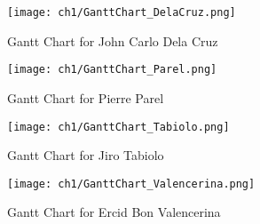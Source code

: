 \begin{figure}[H]
    \centering
    \texttt{[image: ch1/GanttChart\_DelaCruz.png]}
    \caption{Gantt Chart for John Carlo Dela Cruz}
    \label{fig:gantt_jc}
\end{figure}
\begin{figure}[H]
    \centering
    \texttt{[image: ch1/GanttChart\_Parel.png]}
    \caption{Gantt Chart for Pierre Parel}
    \label{fig:gantt_pierre}
\end{figure}
\begin{figure}[H]
    \centering
    \texttt{[image: ch1/GanttChart\_Tabiolo.png]}
    \caption{Gantt Chart for Jiro Tabiolo}
    \label{fig:gantt_jiro}
\end{figure}
\begin{figure}[H]
    \centering
    \texttt{[image: ch1/GanttChart\_Valencerina.png]}
    \caption{Gantt Chart for Ercid Bon Valencerina}
    \label{fig:gantt_bon}
\end{figure}